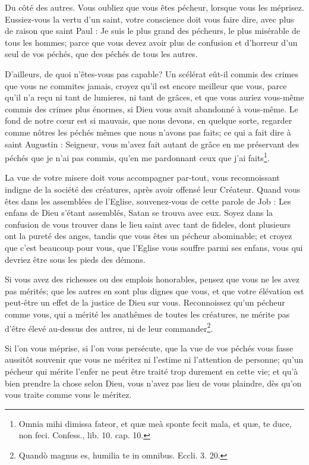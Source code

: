 \documentclass[instructions.tex]{subfiles}
\begin{document}
\tertio Du côté des autres. Vous oubliez que vous êtes pécheur, lorsque vous les méprisez. Eussiez-vous la vertu d’un saint, votre conscience doit vous faire dire, avec plus de raison que saint Paul : Je suis le plus grand des pécheurs, le plus misérable de tous les hommes; parce que vous devez avoir plus de confusion et d’horreur d’un seul de vos péchés, que des péchés de tous les autres.
 
D’ailleurs, de quoi n’êtes-vous pas capable? Un scélérat eût-il commis des crimes que vous ne commites jamais, croyez qu’il est encore meilleur que vous, parce qu’il n’a reçu ni tant de lumieres, ni tant de grâces, et que vous auriez vous-même commis des crimes plus énormes, si Dieu vous avait abandonné à vous-même. Le fond de notre cœur est si mauvais, que nous devons, en quelque sorte, regarder comme nôtres les péchés mêmes que nous n’avons pas faits; ce qui a fait dire à saint Augustin : Seigneur, vous m’avez fait autant de grâce en me préservant des péchés que je n’ai pas commis, qu’en me pardonnant ceux que j’ai faits\footnote{Omnia mihi dimissa fateor, et quæ meà sponte fecit mala, et quæ, te duce, non feci. Confess., lib. 10. cap. 10.}.
 
La vue de votre misere doit vous accompagner par-tout, vous reconnoissant indigne de la société des créatures, après avoir offensé leur Créateur. Quand vous êtes dans les assemblées de l’Eglise, souvenez-vous de cette parole de Job : Les enfans de Dieu s’étant assemblés, Satan se trouva avec eux. Soyez dans la confusion de vous trouver dans le lieu saint avec tant de fideles, dont plusieurs ont la pureté des anges, tandis que vous êtes un pécheur abominable; et croyez que c’est beaucoup pour vous, que l’Eglise vous souffre parmi ses enfans, vous qui devriez être sous les pieds des démons.
 
Si vous avez des richesses ou des emplois honorables, pensez que vous ne les avez pas mérités; que les autres en sont plus dignes que vous, et que votre élévation est peut-être un effet de la justice de Dieu sur vous. Reconnoissez qu’un pécheur comme vous, qui a mérité les anathêmes de toutes les créatures, ne mérite pas d’être élevé au-dessus des autres, ni de leur commander\footnote{Quandò magnus es, humilia te in omnibus. Eccli. 3. 20.}.
 
Si l’on vous méprise, si l’on vous persécute, que la vue de vos péchés vous fasse aussitôt souvenir que vous ne méritez ni l’estime ni l’attention de personne; qu’un pécheur qui mérite l’enfer ne peut être traité trop durement en cette vie; et qu’à bien prendre la chose selon Dieu, vous n’avez pas lieu de vous plaindre, dès qu’on vous traite comme vous le méritez.
 
\end{document}
